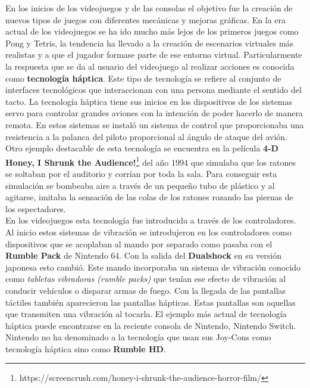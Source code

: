 En los inicios de los videojuegos y de las consolas el objetivo fue la creaci\'on de nuevos tipos de juegos con diferentes mec\'anicas y mejoras gr\'aficas. En la era actual de los videojuegos se ha ido mucho m\'as lejos de los primeros juegos como Pong y Tetris, la tendencia ha llevado a la creaci\'on de escenarios virtuales m\'as realistas y a que el jugador formase parte de ese entorno virtual. Particularmente la respuesta que se da al usuario del videojuego al realizar acciones es conocida como \textbf{tecnolog\'ia h\'aptica}. Este tipo de tecnolog\'ia se refiere al conjunto de interfaces tecnol\'ogicos que interaccionan con una persona mediante el sentido del tacto. La tecnolog\'ia h\'aptica tiene sus inicios en los dispositivos de los sistemas servo para controlar grandes aviones con la intenci\'on de poder hacerlo de manera remota. En estos sistemas se instal\'o un sistema de control que proporcionaba una resistencia a la palanca del piloto proporcional al \'angulo de ataque del avi\'on. Otro ejemplo destacable de esta tecnolog\'ia se encuentra en la pel\'icula \textbf{4-D Honey, I Shrunk the Audience!}\footnote{https://screencrush.com/honey-i-shrunk-the-audience-horror-film/} del a\~no 1994 que simulaba que los ratones se soltaban por el auditorio y corr\'ian por toda la sala. Para conseguir esta simulaci\'on se bombeaba aire a trav\'es de un peque\~no tubo de pl\'astico y al agitarse, imitaba la sensaci\'on de las colas de los ratones rozando las piernas de los espectadores. \\

En los videojuegos esta tecnolog\'ia fue introducida a trav\'es de los controladores. Al inicio estos sistemas de vibraci\'on se introdujeron en los controladores como dispositivos que se acoplaban al mando por separado como pasaba con el \textbf{Rumble Pack} de Nintendo 64. Con la salida del \textbf{Dualshock} en su versi\'on japonesa esto cambi\'o. Este mando incorporaba un sistema de vibraci\'on conocido como \textit{tabletas vibradoras (rumble packs)} que ten\'ian ese efecto de vibraci\'on al conducir veh\'iculos o disparar armas de fuego. Con la llegada de las pantallas t\'actiles tambi\'en aparecieron las pantallas h\'apticas. Estas pantallas son aquellas que transmiten una vibraci\'on al tocarla. El ejemplo m\'as actual de tecnolog\'ia h\'aptica puede encontrarse en la reciente consola de Nintendo, Nintendo Switch. Nintendo no ha denominado a la tecnolog\'ia que usan sus Joy-Cons como tecnolog\'ia h\'aptica sino como \textbf{Rumble HD}. \\

